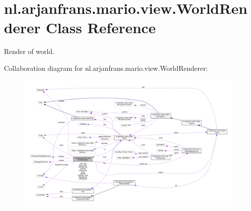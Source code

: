 \hypertarget{classnl_1_1arjanfrans_1_1mario_1_1view_1_1WorldRenderer}{}\section{nl.\+arjanfrans.\+mario.\+view.\+World\+Renderer Class Reference}
\label{classnl_1_1arjanfrans_1_1mario_1_1view_1_1WorldRenderer}


Render of world.  




Collaboration diagram for nl.\+arjanfrans.\+mario.\+view.\+World\+Renderer\+:
\nopagebreak
\begin{figure}[H]
\begin{center}
\leavevmode
\includegraphics[width=350pt]{classnl_1_1arjanfrans_1_1mario_1_1view_1_1WorldRenderer__coll__graph}
\end{center}
\end{figure}
